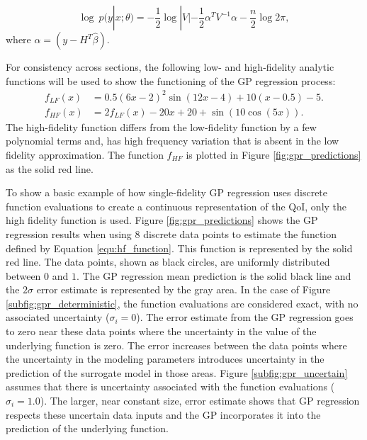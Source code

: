\begin{equation} \label{equ:hyp_param_sf}
    \log~p(y|x;\theta) = -\frac{1}{2} \log|V| - \frac{1}{2}\alpha^T V^{-1}\alpha - \frac{n}{2}\log 2\pi,
\end{equation}
where $\alpha = \left ( y-H^T\hat{\beta} \right )$.

For consistency across sections, the following low- and high-fidelity analytic functions will be used to show the functioning of the GP regression process: 
\begin{align} \label{equ:lf_function}
    f_{LF}(x) &= 0.5 \left ( 6x - 2\right )^2 \sin{ \left (12x -4 \right )} + 10 \left ( x - 0.5 \right ) -5.
\\ \label{equ:hf_function}
    f_{HF}(x) &= 2 f_{LF}(x) - 20x + 20 + \sin {\left ( 10 \cos{ \left ( 5x \right )}\right )}.
\end{align}
The high-fidelity function differs from the low-fidelity function by a few polynomial terms and, has high frequency variation that is absent in the low fidelity approximation. 
The function $f_{HF}$ is plotted in Figure \ref{fig:gpr_predictions} as the solid red line. 

To show a basic example of how single-fidelity GP regression uses discrete function evaluations to create a continuous representation of the QoI, only the high fidelity function is used.
Figure \ref{fig:gpr_predictions} shows the GP regression results when using 8 discrete data points to estimate the function defined by Equation \ref{equ:hf_function}.
This function is represented by the solid red line. 
The data points, shown as black circles, are uniformly distributed between $0$ and $1$.
The GP regression mean prediction is the solid black line and the $2\sigma$ error estimate is represented by the gray area.
In the case of Figure \ref{subfig:gpr_deterministic}, the function evaluations are considered exact, with no associated uncertainty ($\sigma_i = 0$). 
The error estimate from the GP regression goes to zero near these data points where the uncertainty in the value of the underlying function is zero. 
The error increases between the data points where the uncertainty in the modeling parameters introduces uncertainty in the prediction of the surrogate model in those areas. 
Figure \ref{subfig:gpr_uncertain} assumes that there is uncertainty associated with the function evaluations ($\sigma_i = 1.0$).
The larger, near constant size, error estimate shows that GP regression respects these uncertain data inputs and the GP incorporates it into the prediction of the  underlying function.

